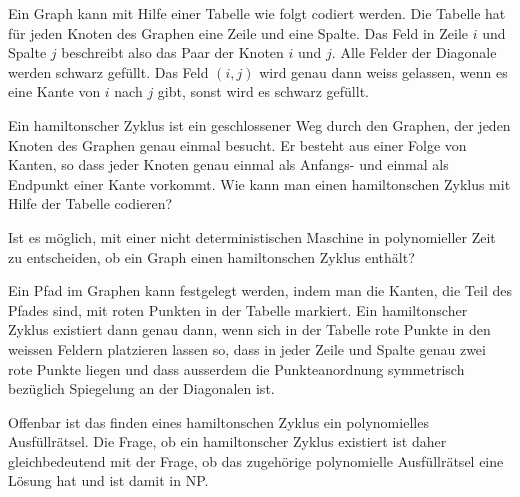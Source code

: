 Ein Graph kann mit Hilfe einer Tabelle wie folgt codiert werden.
Die Tabelle hat für jeden Knoten des Graphen eine Zeile und eine Spalte.
Das Feld in Zeile $i$ und Spalte $j$ beschreibt also das Paar der
Knoten $i$ und $j$.
Alle Felder der Diagonale werden schwarz gefüllt.
Das Feld $(i,j)$  wird genau dann weiss gelassen,
wenn es eine Kante von $i$ nach $j$ gibt, sonst wird es schwarz gefüllt.

\begin{center}
\end{center}


\begin{teilaufgaben}
\item
Ein hamiltonscher Zyklus ist ein geschlossener Weg durch den Graphen, der
jeden Knoten des Graphen genau einmal besucht.
Er besteht aus einer Folge von Kanten, so dass jeder Knoten genau 
einmal als Anfangs- und einmal als Endpunkt einer Kante vorkommt.
Wie kann man einen hamiltonschen Zyklus mit Hilfe der Tabelle codieren?
\item
Ist es möglich, mit einer nicht deterministischen Maschine in polynomieller
Zeit zu entscheiden, ob ein Graph einen hamiltonschen Zyklus enthält?
\end{teilaufgaben}

\begin{loesung}
\begin{teilaufgaben}
\item
Ein Pfad im Graphen kann festgelegt werden, indem man die Kanten, die Teil
des Pfades sind, mit roten Punkten in der Tabelle markiert.
Ein hamiltonscher Zyklus existiert dann genau dann, wenn sich in der Tabelle
rote Punkte in den weissen Feldern platzieren lassen so, dass in jeder
Zeile und Spalte genau zwei rote Punkte liegen und dass ausserdem die
Punkteanordnung symmetrisch bezüglich Spiegelung an der Diagonalen ist.
\item
Offenbar ist das finden eines hamiltonschen Zyklus ein polynomielles
Ausfüllrätsel.
Die Frage, ob ein hamiltonscher Zyklus existiert ist daher gleichbedeutend
mit der Frage, ob das zugehörige polynomielle Ausfüllrätsel eine Lösung hat
und ist damit in NP.
\qedhere
\end{teilaufgaben}
\end{loesung}

